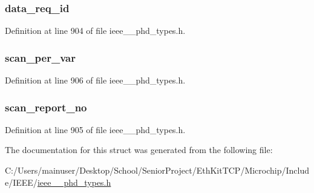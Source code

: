 \subsubsection[{data\+\_\+req\+\_\+id}]{ data\+\_\+req\+\_\+id}\label{struct___scan_report_info_m_p_var_a1c786af4096ed61c5f6cfdf27f317b70}


Definition at line 904 of file ieee\+\_\+\_\+phd\+\_\+types.\+h.

\hypertarget{struct___scan_report_info_m_p_var_add9d65a66abeff2778defd0ade1a9dcd}{}
\subsubsection[{scan\+\_\+per\+\_\+var}]{ scan\+\_\+per\+\_\+var}\label{struct___scan_report_info_m_p_var_add9d65a66abeff2778defd0ade1a9dcd}


Definition at line 906 of file ieee\+\_\+\_\+phd\+\_\+types.\+h.

\hypertarget{struct___scan_report_info_m_p_var_a21f75132869d4d200ffe01d91b4736d8}{}
\subsubsection[{scan\+\_\+report\+\_\+no}]{ scan\+\_\+report\+\_\+no}\label{struct___scan_report_info_m_p_var_a21f75132869d4d200ffe01d91b4736d8}


Definition at line 905 of file ieee\+\_\+\_\+phd\+\_\+types.\+h.



The documentation for this struct was generated from the following file\+:\begin{DoxyCompactItemize}
\item 
C\+:/\+Users/mainuser/\+Desktop/\+School/\+Senior\+Project/\+Eth\+Kit\+T\+C\+P/\+Microchip/\+Include/\+I\+E\+E\+E/\hyperlink{ieee__11073__phd__types_8h}{ieee\+\_\+\_\+phd\+\_\+types.\+h}\end{DoxyCompactItemize}
